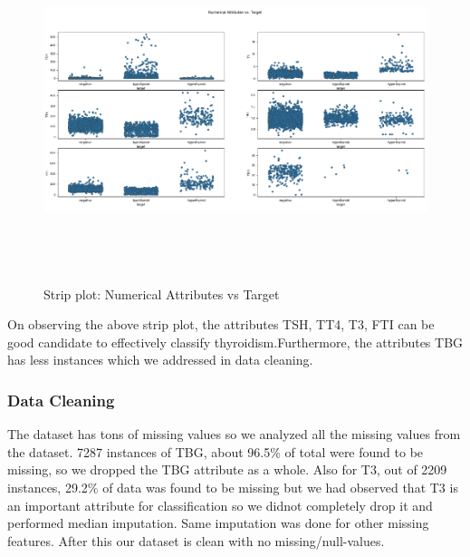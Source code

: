 \begin{figure}[h]
\centering
\includegraphics[height=10cm, width=15cm]{strip.png}
\caption{Strip plot: Numerical Attributes vs Target}
\end{figure}
\newpage
On observing the above strip plot, the attributes TSH, TT4, T3, FTI can be good candidate to effectively classify thyroidism.Furthermore, the attributes TBG has less instances which we addressed in data cleaning.

\subsubsection{Data Cleaning}
The dataset has tons of missing values so we analyzed all the missing values from the dataset. 7287 instances of TBG, about 96.5\% of total were found to be missing, so we dropped the TBG attribute as a whole. Also for T3, out of 2209 instances, 29.2\% of data was found to be missing but we had observed that T3 is an important attribute for classification so we didnot completely drop it and performed median imputation. Same imputation was done for other missing features. After this our dataset is clean with no missing/null-values.

